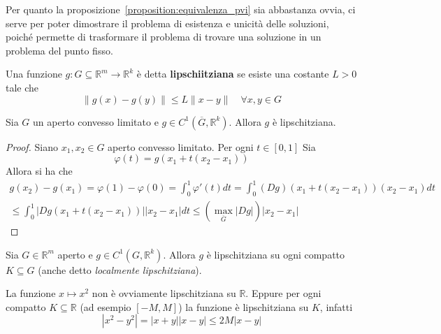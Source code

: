 Per quanto la proposizione~\ref{proposition:equivalenza_pvi} sia abbastanza
ovvia, ci serve per poter dimostrare il problema di esistenza e unicità delle
soluzioni, poiché permette di trasformare il problema di trovare una soluzione
in un problema del punto fisso.

\begin{definition}
Una funzione \(g: G \subseteq \mathbb{R}^{m} \to \mathbb{R}^{k} \) è detta
\textbf{lipschiitziana} se esiste una costante \(L > 0\) tale che 
\[
    \|g(x) - g(y)\| \le L \|x - y\| \quad \forall x, y \in G
\]
\end{definition}
\begin{proposition}
    Sia \(G\) un aperto convesso limitato e \(g \in C^{1}(\overline{G},
    \mathbb{R}^{k})\). Allora \(g\) è lipschitziana.
\end{proposition}
\begin{proof}
    Siano \(x_{1}, x_{2} \in G\) aperto convesso limitato.
    Per ogni \(t \in [0, 1]\) Sia
    \[
        \varphi(t) = g(x_{1} + t(x_{2} - x_{1}))
    \]
    Allora si ha che
    \begin{align*}
        g(x_{2}) - g(x_{1}) = \varphi(1) - \varphi(0) =
        \int_{0}^{1}\varphi'(t)dt = \int_{0}^{1} (Dg)(x_{1} +
        t(x_{2}-x_{1}))(x_{2}-x_{1})dt \\
        \le \int_{0}^{1} |Dg(x_{1} + t(x_{2}-x_{1}))| |x_{2}-x_{1}| dt \le
        \left(\max_{\overline{G}} |Dg|\right) |x_{2}-x_{1}|
    \end{align*}
\end{proof}
\begin{proposition}
    Sia \(G \in \mathbb{R}^{m}\) aperto e \(g \in C^{1}(G, \mathbb{R}^{k})\).
    Allora \(g\) è lipschitziana su ogni compatto \(K \subseteq G\) (anche detto
    \emph{localmente lipschitziana}).
\end{proposition}
\begin{example}
    La funzione \(x \mapsto x^2\) non è ovviamente lipschitziana su
    \(\mathbb{R}\). Eppure per ogni compatto \(K \subseteq \mathbb{R}\) (ad
    esempio \([-M, M]\)) la funzione è lipschitziana su \(K\), infatti 
    \[
        |x^2 - y^2| = |x+y||x-y| \le 2M|x-y|
    \]
\end{example}

